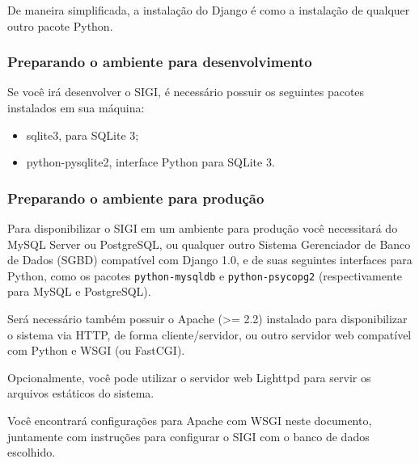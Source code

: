 De maneira simplificada, a instalação do Django é como a instalação de
qualquer outro pacote Python.



\hypertarget{preparando-o-ambiente-para-desenvolvimento}{}
\subsubsection*{Preparando o ambiente para desenvolvimento}

Se você irá desenvolver o SIGI, é necessário possuir os seguintes
pacotes instalados em sua máquina:
\begin{itemize}
\item {} 
sqlite3, para SQLite 3;

\item {} 
python-pysqlite2, interface Python para SQLite 3.

\end{itemize}



\hypertarget{preparando-o-ambiente-para-produ-o}{}
\subsubsection*{Preparando o ambiente para produção}

Para disponibilizar o SIGI em um ambiente para produção você
necessitará do MySQL Server ou PostgreSQL, ou qualquer outro Sistema
Gerenciador de Banco de Dados (SGBD) compatível com Django 1.0, e de
suas seguintes interfaces para Python, como os pacotes
\texttt{python-mysqldb} e \texttt{python-psycopg2} (respectivamente para MySQL e
PostgreSQL).

Será necessário também possuir o Apache ({\textgreater}= 2.2) instalado para
disponibilizar o sistema via HTTP, de forma cliente/servidor, ou outro
servidor web compatível com Python e WSGI (ou FastCGI).

Opcionalmente, você pode utilizar o servidor web Lighttpd para servir
os arquivos estáticos do sistema.

Você encontrará configurações para Apache com WSGI neste documento,
juntamente com instruções para configurar o SIGI com o banco de dados
escolhido.


